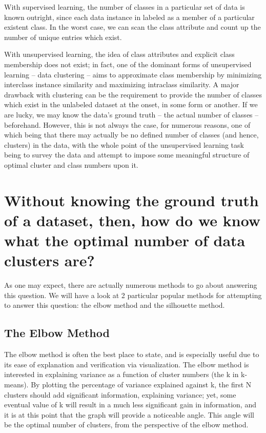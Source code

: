 \documentclass[
]{book}
\begin{document}
With supervised learning, the number of classes in a particular set of data is known outright, since each data instance in labeled as a member of a particular existent class. In the worst case, we can scan the class attribute and count up the number of unique entries which exist.

With unsupervised learning, the idea of class attributes and explicit class membership does not exist; in fact, one of the dominant forms of unsupervised learning -- data clustering -- aims to approximate class membership by minimizing interclass instance similarity and maximizing intraclass similarity. A major drawback with clustering can be the requirement to provide the number of classes which exist in the unlabeled dataset at the onset, in some form or another. If we are lucky, we may know the data's ground truth -- the actual number of classes -- beforehand. However, this is not always the case, for numerous reasons, one of which being that there may actually be no defined number of classes (and hence, clusters) in the data, with the whole point of the unsupervised learning task being to survey the data and attempt to impose some meaningful structure of optimal cluster and class numbers upon it.

\hypertarget{without-knowing-the-ground-truth-of-a-dataset-then-how-do-we-know-what-the-optimal-number-of-data-clusters-are}{%
\section{Without knowing the ground truth of a dataset, then, how do we know what the optimal number of data clusters are?}\label{without-knowing-the-ground-truth-of-a-dataset-then-how-do-we-know-what-the-optimal-number-of-data-clusters-are}}

As one may expect, there are actually numerous methods to go about answering this question. We will have a look at 2 particular popular methods for attempting to answer this question: the elbow method and the silhouette method.

\hypertarget{the-elbow-method}{%
\subsection{The Elbow Method}\label{the-elbow-method}}

The elbow method is often the best place to state, and is especially useful due to its ease of explanation and verification via visualization. The elbow method is interested in explaining variance as a function of cluster numbers (the k in k-means). By plotting the percentage of variance explained against k, the first N clusters should add significant information, explaining variance; yet, some eventual value of k will result in a much less significant gain in information, and it is at this point that the graph will provide a noticeable angle. This angle will be the optimal number of clusters, from the perspective of the elbow method.
\end{document}
